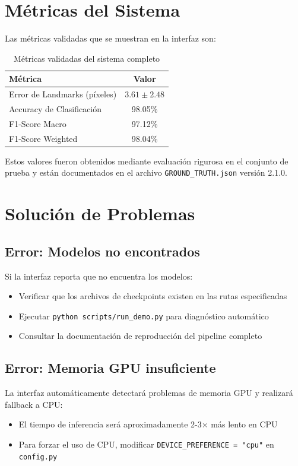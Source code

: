 \section{Métricas del Sistema}

Las métricas validadas que se muestran en la interfaz son:

\begin{table}[H]
\centering
\begin{tabular}{lc}
\toprule
\textbf{Métrica} & \textbf{Valor} \\
\midrule
Error de Landmarks (píxeles) & $3.61 \pm 2.48$ \\
Accuracy de Clasificación & 98.05\% \\
F1-Score Macro & 97.12\% \\
F1-Score Weighted & 98.04\% \\
\bottomrule
\end{tabular}
\caption{Métricas validadas del sistema completo}
\end{table}

Estos valores fueron obtenidos mediante evaluación rigurosa en el conjunto de prueba y están documentados en el archivo \texttt{GROUND\_TRUTH.json} versión 2.1.0.

\section{Solución de Problemas}

\subsection{Error: Modelos no encontrados}

Si la interfaz reporta que no encuentra los modelos:
\begin{itemize}
    \item Verificar que los archivos de checkpoints existen en las rutas especificadas
    \item Ejecutar \texttt{python scripts/run\_demo.py} para diagnóstico automático
    \item Consultar la documentación de reproducción del pipeline completo
\end{itemize}

\subsection{Error: Memoria GPU insuficiente}

La interfaz automáticamente detectará problemas de memoria GPU y realizará fallback a CPU:
\begin{itemize}
    \item El tiempo de inferencia será aproximadamente 2-3× más lento en CPU
    \item Para forzar el uso de CPU, modificar \texttt{DEVICE\_PREFERENCE = "cpu"} en \texttt{config.py}
\end{itemize}

